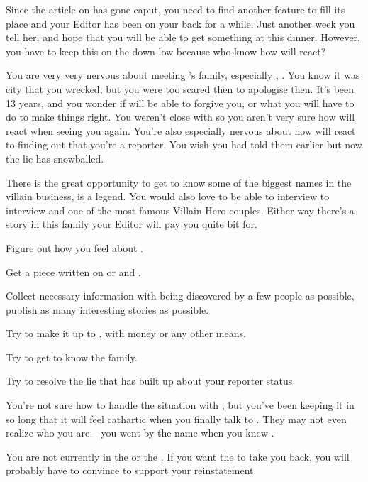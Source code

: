 \documentclass[char]{LRSguildcamp1}
\begin{document}
Since the article on \cYoungest{} has gone caput, you need to find another feature to fill its place and your Editor has been on your back for a while. Just another week you tell her, and hope that you will be able to get something at this dinner. However, you have to keep this on the down-low because who know how \cYoungest{\they} will react? 

You are very very nervous about meeting \cYoungest{}'s family, especially \cOS{\MYsupername}, \cOS{}. You know it was \cOS{\their} city that you wrecked, but you were too scared then to apologise then. It's been 13 years, and you wonder if \cOS{\they} will be able to forgive you, or what you will have to do to make things right. You weren't close with \cOS{} so you aren't very sure how \cOS{\they} will react when seeing you again. You're also especially nervous about how \cYoungest{} will react to finding out that you're a reporter. You wish you had told them earlier but now the lie has snowballed. 

There is the great opportunity to get to know some of the biggest names in the villain business, \cGrandma{\MYsupername} is a legend. You would also love to be able to interview to interview \cOldest{\MYsupername} and \cOS{\MYsupername} one of the most famous Villain-Hero couples. Either way there's a story in this family your Editor will pay you quite bit for. 


\begin{itemz}[Goals]
	\item Figure out how you feel about \cYoungest{}. 
	\item Get a piece written on \cGrandma{} or \cOldest{} and \cOS{}. 
	\item Collect necessary information with being discovered by a few people as possible, publish as many interesting stories as possible.
	\item Try to make it up to \cOS{}, with money or any other means.
	\item Try to get to know the family. 
	\item Try to resolve the lie that has built up about your reporter status
\end{itemz}

\begin{itemz}[Notes]
	\item You're not sure how to handle the situation with \cOS{}, but you've been keeping it in so long that it will feel cathartic when you finally talk to \cOS{\them}.  They may not even realize who you are -- you went by the name \cYSOldName{} when you knew \cOS{\them}. 
	\item You are not currently in the \cHeroLeague{\intro} or the \cVillainCompact{\intro}.  If you want the \cHeroLeague{} to take you back, you will probably have to convince \cYoungest{} to support your reinstatement. 

\end{itemz}
\end{document}

